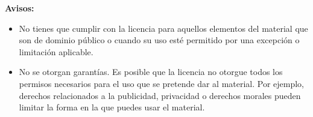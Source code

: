 {\textbf{Avisos:}

\begin{itemize}

\item
  No tienes que cumplir con la licencia para aquellos elementos del
  material que son de dominio público o cuando su uso esté permitido
  por una excepción o limitación aplicable. 

\item
  No se otorgan garantías. Es posible que la licencia no otorgue
  todos los permisos necesarios para el uso que se pretende dar al material. 
  Por ejemplo, derechos relacionados a la publicidad, privacidad o derechos morales 
  pueden limitar la forma en la que puedes usar el material.

\end{itemize}
}
